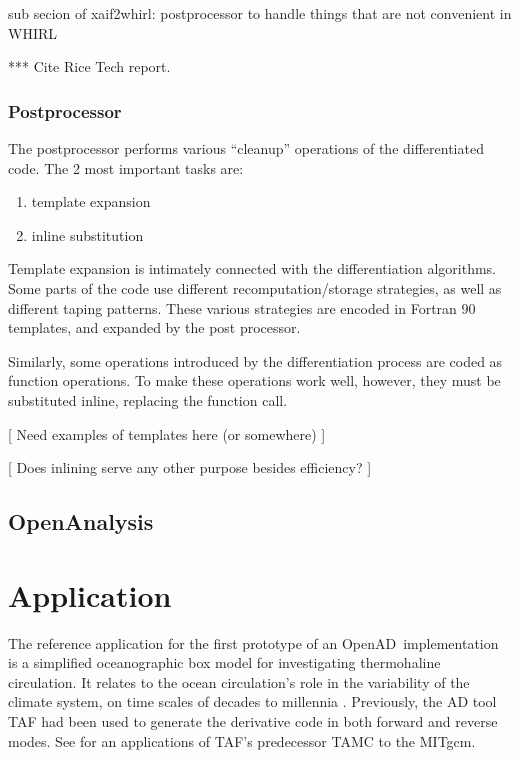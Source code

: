 \documentclass[acmtocl,acmnow]{acmtrans2m}
\newcommand{\OpenAD}{OpenAD}
\newcommand{\OpenAnalysis}{OpenAnalysis}
\begin{document}
sub secion of xaif2whirl: postprocessor to handle things that are not
convenient in WHIRL

*** Cite Rice Tech report.

\subsubsection*{Postprocessor}
The postprocessor performs various ``cleanup'' operations of the
differentiated code. The 2 most important tasks are:

   \begin{enumerate}
      \item template expansion
      \item inline substitution
   \end{enumerate}

Template expansion is intimately connected with the differentiation
algorithms. Some parts of the code use different recomputation/storage
strategies, as well as different taping patterns. These various
strategies are encoded in Fortran 90 templates, and expanded by the
post processor.

Similarly, some operations introduced by the differentiation process
are coded as function operations. To make these operations work well,
however, they must be substituted inline, replacing the function call.


[ Need examples of templates here (or somewhere) ]


[ Does inlining serve any other purpose besides efficiency? ]

\subsection{\OpenAnalysis} 



\section{Application}

The reference application for the first prototype of an \OpenAD\ implementation
is a simplified oceanographic box model for investigating
thermohaline circulation. It relates to the
ocean circulation's role in the variability of the climate system,
on time scales of decades to millennia \cite{tzi-ioa:02}.
Previously, the AD tool TAF \cite{GiKa02} 
had been used to generate the derivative
code in both forward and reverse modes.
See \cite{maro-eta:99} for an applications of
TAF's predecessor TAMC to the MITgcm.
\end{document}
